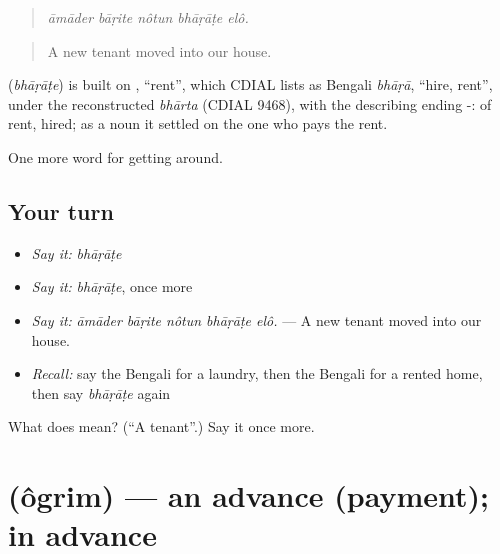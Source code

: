 \begin{quote}
    
\end{quote}

\begin{quote}
\emph{āmāder bāṛite nôtun bhāṛāṭe elô.}
\end{quote}

\begin{quote}
A new tenant moved into our house.
\end{quote}

\begin{cousinweb}
\textbf{} (\emph{bhāṛāṭe}) is built on \textbf{}, \textquotedblleft{}rent\textquotedblright{}, which CDIAL lists as Bengali \emph{bhāṛā}, \textquotedblleft{}hire, rent\textquotedblright{}, under the reconstructed \emph{bhārta} (CDIAL 9468), with the describing ending -: of rent, hired; as a noun it settled on the one who pays the rent.
\end{cousinweb}

\begin{grammarlens}[title={What you've built}]
One more word for getting around.
\end{grammarlens}

\subsection*{Your turn}
\begin{itemize}
\raggedright
  \item \emph{Say it:} \emph{bhāṛāṭe}
  \item \emph{Say it:} \emph{bhāṛāṭe}, once more
  \item \emph{Say it:} \emph{āmāder bāṛite nôtun bhāṛāṭe elô.} — A new tenant moved into our house.
  \item \emph{Recall:} say the Bengali for a laundry, then the Bengali for a rented home, then say \emph{bhāṛāṭe} again
\end{itemize}

\begin{tcolorbox}[breakable,colback=teal!4,colframe=teal!35!black,title={Before you move on}]
What does  mean? (\textquotedblleft{}A tenant\textquotedblright{}.) Say it once more.
\end{tcolorbox}
\section[\texorpdfstring{\bn{অগ্রিম} (ôgrim)}{অগ্রিম (ôgrim)}]{ (ôgrim) — an advance (payment); in advance}

